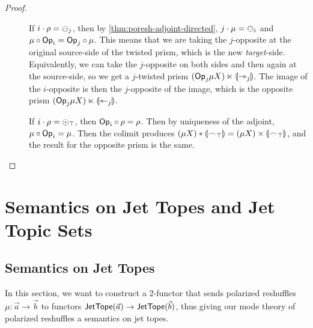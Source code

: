 \documentclass[a4paper]{memoir}
\begin{document}
\begin{proof}
\begin{description}
		\item[] If $i \cdot \rho = {\ominus}_j$, then by \cref{thm:poresh-adjoint-directed}, $j \cdot \mu = {\ominus}_i$ and $\mu \circ {\mathsf{Op}}_i = {\mathsf{Op}}_j \circ \mu$.
		This means that we are taking the $j$-opposite at the original source-side of the twisted prism, which is the new \emph{target}-side. Equivalently, we can take the $j$-opposite on both sides and then again at the source-side, so we get a $j$-twisted prism $({\mathsf{Op}}_j \mu X) \ltimes {\llparenthesis {\rightarrowtriangle}_j \rrparenthesis}$.
		The image of the $i$-opposite is then the $j$-opposite of the image, which is the opposite prism $({\mathsf{Op}}_j \mu X) \ltimes {\llparenthesis {\leftarrowtriangle}_j \rrparenthesis}$.
		
		\item[\framebox{$\nonpol_\top$}] If $i \cdot \rho = {\odot}_\top$, then ${\mathsf{Op}}_i \circ \rho = \rho$.
		Then by uniqueness of the adjoint, $\mu \circ {\mathsf{Op}}_i = \mu$.
		Then the colimit produces $(\mu X) * {\llparenthesis {\frown}_\top \rrparenthesis} = (\mu X) \times {\llparenthesis {\frown}_\top \rrparenthesis}$, and the result for the opposite prism is the same. \qedhere
	\end{description}
\end{proof}

\section{Semantics on Jet Topes and Jet Topic Sets} \label{sec:poresh-jettope-jtset}

\subsection{Semantics on Jet Topes} \label{sec:poresh-jettope}
In this section, we want to construct a 2-functor that sends polarized reshuffles $\mu : \vec a \to \vec b$ to functors $\mathsf{JetTope}(\vec a) \to \mathsf{JetTope}(\vec b)$, thus giving our mode theory of polarized reshuffles a semantics on jet topes.
\end{document}
